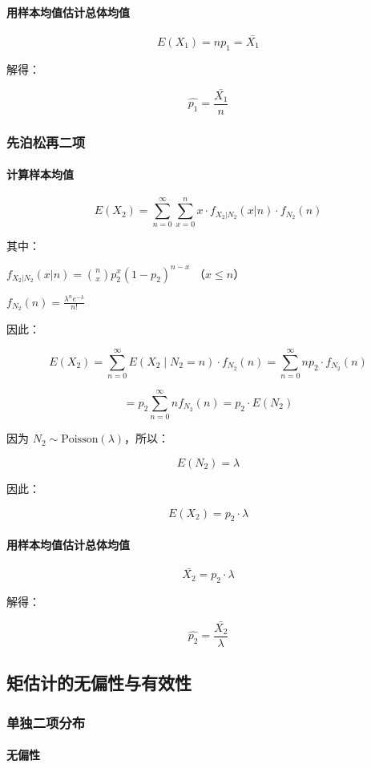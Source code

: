 \documentclass{article}
\begin{document}
\paragraph{用样本均值估计总体均值}
$$
E(X_1) = np_1 = \bar{X_1}
$$

解得：

$$
\hat{p_1} = \frac{\bar{X_1}}{n}
$$

\subsubsection{先泊松再二项}
\paragraph{计算样本均值}
$$
E(X_2) = \sum_{n=0}^\infty \sum_{x=0}^n x \cdot f_{X_2|N_2}(x | n) \cdot f_{N_2}(n)
$$

其中：

$ f_{X_2|N_2}(x | n) = \binom{n}{x} p_2^x (1-p_2)^{n - x} $ （$ x \leq n $）

$ f_{N_2}(n) = \frac{\lambda^n e^{-\lambda}}{n!} $

因此：

$$
E(X_2) = \sum_{n=0}^\infty E(X_2 \mid N_2 = n) \cdot f_{N_2}(n) = \sum_{n=0}^\infty np_2 \cdot f_{N_2}(n)
$$

$$
= p_2 \sum_{n=0}^\infty n f_{N_2}(n) = p_2 \cdot E(N_2)
$$

因为 $ N_2 \sim \text{Poisson}(\lambda) $，所以：

$$
E(N_2) = \lambda
$$

因此：

$$
E(X_2) = p_2 \cdot \lambda
$$

\paragraph{用样本均值估计总体均值}
$$
\bar{X_2} = p_2 \cdot \lambda
$$

解得：

$$
\hat{p_2} = \frac{\bar{X_2}}{\lambda}
$$




\subsection{矩估计的无偏性与有效性}
\subsubsection{单独二项分布}   
\paragraph{无偏性}
\end{document}
